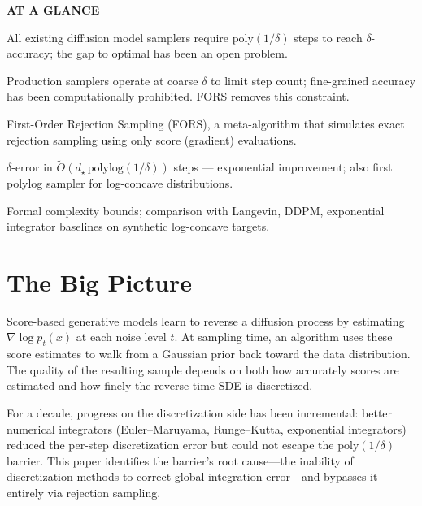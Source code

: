 \documentclass[10pt,twocolumn]{article}
\begin{document}
\begin{mdframed}[backgroundcolor=boxgray,linecolor=rulered,linewidth=1pt,
    innerleftmargin=6pt,innerrightmargin=6pt,
    innertopmargin=6pt,innerbottommargin=6pt]
\textbf{\small AT A GLANCE}\par\vspace{4pt}
\begin{description}[leftmargin=0pt,labelsep=4pt,itemsep=2pt,parsep=0pt,
    font=\small\bfseries]
  \item[Problem:] All existing diffusion model samplers require
    $\mathrm{poly}(1/\delta)$ steps to reach $\delta$-accuracy; the gap to
    optimal has been an open problem.
  \item[Why it matters:] Production samplers operate at coarse $\delta$ to
    limit step count; fine-grained accuracy has been computationally
    prohibited. FORS removes this constraint.
  \item[Method:] First-Order Rejection Sampling (FORS), a meta-algorithm
    that simulates exact rejection sampling using only score (gradient)
    evaluations.
  \item[Result:] $\delta$-error in $\widetilde{O}(d_\star\,\mathrm{polylog}(1/\delta))$
    steps --- exponential improvement; also first polylog sampler for
    log-concave distributions.
  \item[Evidence:] Formal complexity bounds; comparison with Langevin,
    DDPM, exponential integrator baselines on synthetic log-concave targets.
\end{description}
\end{mdframed}

\section{The Big Picture}

Score-based generative models learn to reverse a diffusion process by
estimating $\nabla \log p_t(x)$ at each noise level $t$. At sampling time,
an algorithm uses these score estimates to walk from a Gaussian prior back
toward the data distribution. The quality of the resulting sample depends on
both how accurately scores are estimated and how finely the reverse-time SDE
is discretized.

For a decade, progress on the discretization side has been incremental:
better numerical integrators (Euler--Maruyama, Runge--Kutta, exponential
integrators) reduced the per-step discretization error but could not
escape the $\mathrm{poly}(1/\delta)$ barrier. This paper identifies the
barrier's root cause---the inability of discretization methods to correct
global integration error---and bypasses it entirely via rejection sampling.
\end{document}
